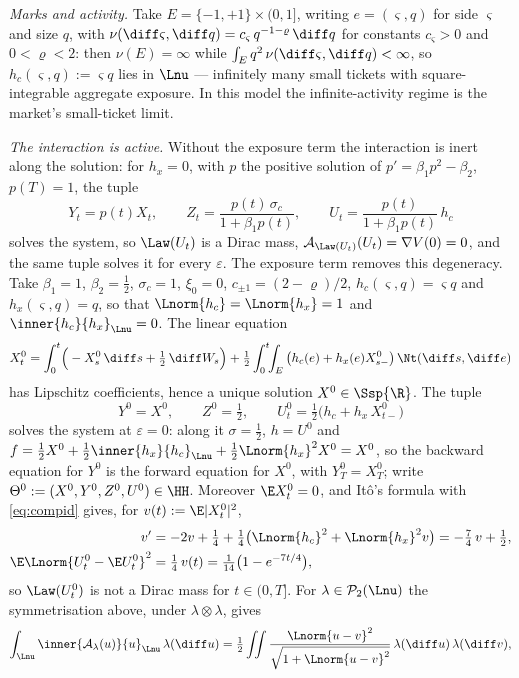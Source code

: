\begin{example}
\smallskip
\emph{Marks and activity.} Take $E=\{-1,+1\}\times(0,1]$, writing $e=(\varsigma,q)$ for
side $\varsigma$ and size $q$, with
$\nu(\diff\varsigma,\diff q)=c_\varsigma\,q^{-1-\varrho}\,\diff q$ for constants
$c_\varsigma>0$ and $0<\varrho<2$: then $\nu(E)=\infty$ while
$\int_E q^2\,\nu(\diff\varsigma,\diff q)<\infty$, so $h_c(\varsigma,q):=\varsigma q$ lies
in $\Lnu$ --- infinitely many small tickets with square-integrable aggregate exposure. In
this model the infinite-activity regime is the market's small-ticket limit.

\smallskip
\emph{The interaction is active.} Without the exposure term the interaction is inert along
the solution: for $h_x=0$, with $p$ the positive solution of $p'=\beta_1p^2-\beta_2$,
$p(T)=1$, the tuple
\[
Y_t=p(t)X_t,\qquad Z_t=\frac{p(t)\,\sigma_c}{1+\beta_1p(t)},\qquad
U_t=\frac{p(t)}{1+\beta_1p(t)}\,h_c
\]
solves the system, so $\Law(U_t)$ is a Dirac mass, $\mathcal A_{\Law(U_t)}(U_t)=\nabla V(0)=0$,
and the same tuple solves it for every $\varepsilon$. The exposure term removes this
degeneracy. Take $\beta_1=1$, $\beta_2=\tfrac12$, $\sigma_c=1$, $\xi_0=0$,
$c_{\pm1}=(2-\varrho)/2$, $h_c(\varsigma,q)=\varsigma q$ and $h_x(\varsigma,q)=q$, so that
$\Lnorm{h_c}=\Lnorm{h_x}=1$ and $\inner{h_c}{h_x}_{\Lnu}=0$. The linear equation
\[
X^0_t=\int_0^t\!\Big(-X^0_s\,\diff s+\tfrac12\,\diff W_s\Big)
+\tfrac12\int_0^t\!\!\int_E\big(h_c(e)+h_x(e)X^0_{s-}\big)\,\Nt(\diff s,\diff e)
\]
has Lipschitz coefficients, hence a unique solution $X^0\in\Ssp{\R}$. The tuple
\[
Y^0=X^0,\qquad Z^0=\tfrac12,\qquad U^0_t=\tfrac12\big(h_c+h_x\,X^0_{t-}\big)
\]
solves the system at $\varepsilon=0$: along it $\sigma=\tfrac12$, $h=U^0$ and
$f=\tfrac12X^0+\tfrac12\inner{h_x}{h_c}_{\Lnu}+\tfrac12\Lnorm{h_x}^2X^0=X^0$, so the backward
equation for $Y^0$ is the forward equation for $X^0$, with $Y^0_T=X^0_T$; write $\Theta^0:=(X^0,Y^0,Z^0,U^0)\in\HH$. Moreover
$\E X^0_t=0$, and It\^o's formula with \eqref{eq:compid} gives, for
$v(t):=\E|X^0_t|^2$,
\[
\begin{aligned}
v'&=-2v+\tfrac14+\tfrac14\big(\Lnorm{h_c}^2+\Lnorm{h_x}^2v\big)=-\tfrac74\,v+\tfrac12,\\
\E\Lnorm{U^0_t-\E U^0_t}^2&=\tfrac14\,v(t)=\tfrac1{14}\big(1-e^{-7t/4}\big),
\end{aligned}
\]
so $\Law(U^0_t)$ is not a Dirac mass for $t\in(0,T]$. For $\lambda\in\mathcal P_2(\Lnu)$ the
symmetrisation above, under $\lambda\otimes\lambda$, gives
\[
\int_{\Lnu}\inner{\mathcal A_\lambda(u)}{u}_{\Lnu}\,\lambda(\diff u)
=\tfrac12\iint\frac{\Lnorm{u-v}^2}{\sqrt{1+\Lnorm{u-v}^2}}\,\lambda(\diff u)\,\lambda(\diff v),
\]
\end{example}

